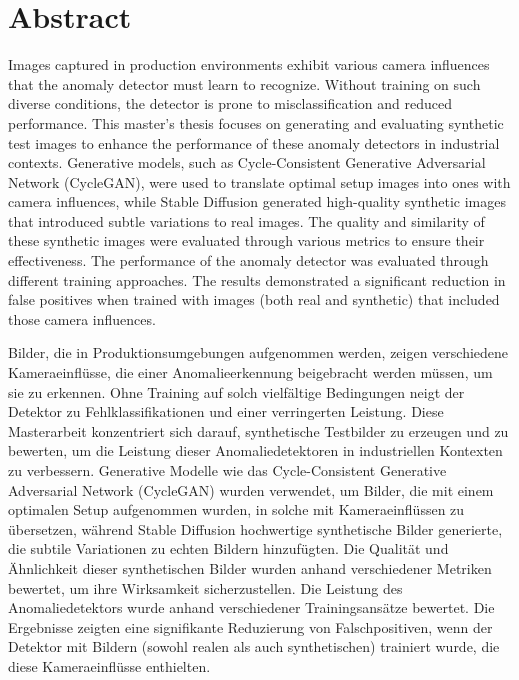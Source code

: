 \documentclass[12pt,DIV14,BCOR12mm,a4paper,footinclude=false,headinclude,parskip=half-,twoside,openright,cleardoublepage=empty,toc=index,bibliography=totoc,listof=totoc]{scrreprt}
\title{\maintitle}%
\subtitle{\translatedtitle}
\author{
\large
  \ifthenelse{\equal{\doclang}{german}}{
  \begin{tabular}{rp{7cm}}
    \Large 
    Autor:      & \Large \student \vspace*{2mm}\\
    Ausgabe:    & \startdate \\
    Abgabe:     & \submission \vspace*{3mm}\\
    Betreuer:   & \tutor \vspace*{2mm}\\
    Stichworte: & \keywords
  \end{tabular}
  }{
  \begin{tabular}{rp{7cm}}
    \Large 
    Author:             & \Large \student \vspace*{2mm}\\
    Date of work begin: & \startdate \\
    Date of submission: & \submission \vspace*{3mm}\\
    Supervisor:         & \tutor \vspace*{2mm}\\
    Keywords:           & \keywords
  \end{tabular}
  }
  \bugfix
}
\date{}
\numberwithin{equation}{chapter}
\begin{document}
\maketitle
\newpage %

\section*{Abstract} %

Images captured in production environments exhibit various camera influences that the anomaly detector must learn to recognize. Without training on such diverse conditions, the detector is prone to misclassification and reduced performance. This master's thesis focuses on generating and evaluating synthetic test images to enhance the performance of these anomaly detectors in industrial contexts. Generative models, such as Cycle-Consistent Generative Adversarial Network (CycleGAN), were used to translate optimal setup images into ones with camera influences, while Stable Diffusion generated high-quality synthetic images that introduced subtle variations to real images. The quality and similarity of these synthetic images were evaluated through various metrics to ensure their effectiveness. The performance of the anomaly detector was evaluated through different training approaches. The results demonstrated a significant reduction in false positives when trained with images (both real and synthetic) that included those camera influences.

\vspace{10pt} %

Bilder, die in Produktionsumgebungen aufgenommen werden, zeigen verschiedene Kameraeinflüsse, die einer Anomalieerkennung beigebracht werden müssen, um sie zu erkennen. Ohne Training auf solch vielfältige Bedingungen neigt der Detektor zu Fehlklassifikationen und einer verringerten Leistung. Diese Masterarbeit konzentriert sich darauf, synthetische Testbilder zu erzeugen und zu bewerten, um die Leistung dieser Anomaliedetektoren in industriellen Kontexten zu verbessern. Generative Modelle wie das Cycle-Consistent Generative Adversarial Network (CycleGAN) wurden verwendet, um Bilder, die mit einem optimalen Setup aufgenommen wurden, in solche mit Kameraeinflüssen zu übersetzen, während Stable Diffusion hochwertige synthetische Bilder generierte, die subtile Variationen zu echten Bildern hinzufügten. Die Qualität und Ähnlichkeit dieser synthetischen Bilder wurden anhand verschiedener Metriken bewertet, um ihre Wirksamkeit sicherzustellen. Die Leistung des Anomaliedetektors wurde anhand verschiedener Trainingsansätze bewertet. Die Ergebnisse zeigten eine signifikante Reduzierung von Falschpositiven, wenn der Detektor mit Bildern (sowohl realen als auch synthetischen) trainiert wurde, die diese Kameraeinflüsse enthielten.
\end{document}
